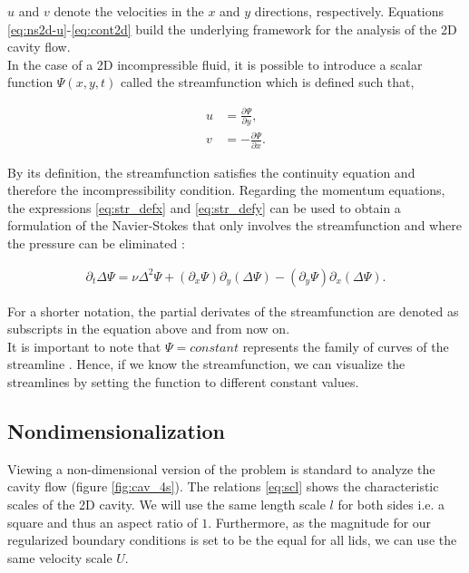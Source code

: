 $u$ and $v$ denote the velocities in the $x$ and $y$ directions, respectively.
Equations \eqref{eq:ns2d-u}-\eqref{eq:cont2d} build the underlying framework
for the analysis of the 2D cavity flow. \\

In the case of a 2D incompressible fluid, it is possible to introduce a scalar
function $\Psi(x,y,t)$ called the streamfunction which is defined such that,

\begin{align}
u & = \frac{\partial \Psi}{\partial y}, \label{eq:str_defx} \\
v & = -\frac{\partial \Psi}{\partial x}. \label{eq:str_defy} 
\end{align}

By its definition, the streamfunction satisfies the continuity equation and
therefore the incompressibility condition. Regarding the momentum equations,
the expressions \eqref{eq:str_defx} and \eqref{eq:str_defy} can be used to
obtain a formulation of the Navier-Stokes that only involves the streamfunction
and where the pressure can be eliminated \citep{landau1987}:

\begin{align}
\partial_t \Delta \Psi = \nu \Delta^2 \Psi
  + (\partial_x \Psi) \partial_y(\Delta \Psi)
  - (\partial_y \Psi) \partial_x(\Delta \Psi). \label{eq:str_dim}
\end{align}

For a shorter notation, the partial derivates of the streamfunction are denoted
as subscripts in the equation above and from now on. \\

It is important to note that $\Psi = constant$ represents the family of curves
of the streamline \citep{landau1987}. Hence, if we know the streamfunction, we
can visualize the streamlines by setting the function to different constant
values.

\subsection{Nondimensionalization}

Viewing a non-dimensional version of the problem is standard to analyze the
cavity flow (figure \ref{fig:cav_4s}). The relations \eqref{eq:scl} shows the
characteristic scales of the 2D cavity. We will use the same length scale $l$
for both sides i.e. a square and thus an aspect ratio of $1$. Furthermore, as
the magnitude for our regularized boundary conditions is set to be the equal
for all lids, we can use the same velocity scale $U$.

